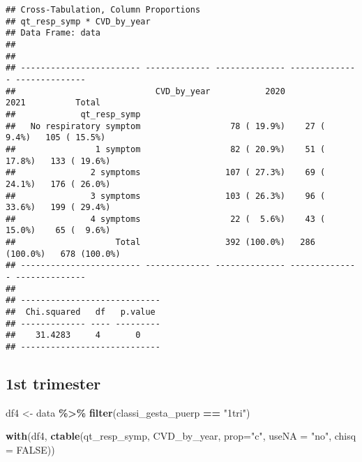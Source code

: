 \documentclass[
]{article}
\newenvironment{Shaded}{\begin{snugshade}}{\end{snugshade}}
\newcommand{\AttributeTok}[1]{\textcolor[rgb]{0.13,0.29,0.53}{#1}}
\newcommand{\ConstantTok}[1]{\textcolor[rgb]{0.56,0.35,0.01}{#1}}
\newcommand{\FunctionTok}[1]{\textcolor[rgb]{0.13,0.29,0.53}{\textbf{#1}}}
\newcommand{\NormalTok}[1]{#1}
\newcommand{\OtherTok}[1]{\textcolor[rgb]{0.56,0.35,0.01}{#1}}
\newcommand{\SpecialCharTok}[1]{\textcolor[rgb]{0.81,0.36,0.00}{\textbf{#1}}}
\newcommand{\StringTok}[1]{\textcolor[rgb]{0.31,0.60,0.02}{#1}}
\begin{document}
\begin{verbatim}
## Cross-Tabulation, Column Proportions  
## qt_resp_symp * CVD_by_year  
## Data Frame: data  
## 
## 
## ------------------------ ------------- -------------- -------------- --------------
##                            CVD_by_year           2020           2021          Total
##             qt_resp_symp                                                           
##   No respiratory symptom                  78 ( 19.9%)    27 (  9.4%)   105 ( 15.5%)
##                1 symptom                  82 ( 20.9%)    51 ( 17.8%)   133 ( 19.6%)
##               2 symptoms                 107 ( 27.3%)    69 ( 24.1%)   176 ( 26.0%)
##               3 symptoms                 103 ( 26.3%)    96 ( 33.6%)   199 ( 29.4%)
##               4 symptoms                  22 (  5.6%)    43 ( 15.0%)    65 (  9.6%)
##                    Total                 392 (100.0%)   286 (100.0%)   678 (100.0%)
## ------------------------ ------------- -------------- -------------- --------------
## 
## ----------------------------
##  Chi.squared   df   p.value 
## ------------- ---- ---------
##    31.4283     4       0    
## ----------------------------
\end{verbatim}

\hypertarget{st-trimester-4}{%
\subsection{1st trimester}\label{st-trimester-4}}

\begin{Shaded}
\begin{Highlighting}[]
\NormalTok{df4 }\OtherTok{\textless{}{-}}\NormalTok{ data }\SpecialCharTok{\%\textgreater{}\%} 
  \FunctionTok{filter}\NormalTok{(classi\_gesta\_puerp }\SpecialCharTok{==} \StringTok{"1tri"}\NormalTok{)}

\FunctionTok{with}\NormalTok{(df4, }\FunctionTok{ctable}\NormalTok{(qt\_resp\_symp, CVD\_by\_year, }\AttributeTok{prop=}\StringTok{"c"}\NormalTok{, }\AttributeTok{useNA =} \StringTok{"no"}\NormalTok{, }\AttributeTok{chisq =} \ConstantTok{FALSE}\NormalTok{))}
\end{Highlighting}
\end{Shaded}
\end{document}
